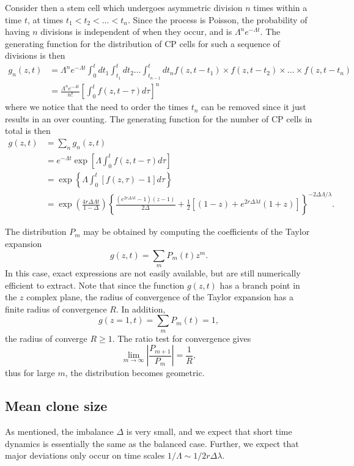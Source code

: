 \documentclass[10pt,UKenglish]{article}
\begin{document}
Consider then a stem cell which undergoes asymmetric division $n$ times within a
time $t$, at times $t_1 < t_2 < \ldots < t_n$. Since the process is Poisson, the
probability of having $n$ divisions is independent of when they occur, and is
$\Lambda^n e^{-\Lambda t}$. The generating function for the distribution of CP
cells for such a sequence of divisions is then
\begin{align*}
g_n(z,t) &= \Lambda^n e^{-\Lambda t} \int_0^t dt_1 \int_{t_1}^t dt_2 \ldots \int_{t_{n-1}}^t dt_n f(z,t-t_1) \times f(z,t-t_2) \times \ldots \times f(z,t-t_n) \\
 &= \frac{\Lambda^n e^{-\Lambda t}}{n!} \left[\int_0^t f(z,t-\tau) d\tau \right]^n
\end{align*}
where we notice that the need to order the times $t_n$ can be removed since it
just results in an over counting. The generating function for the number of CP
cells in total is then
\begin{align*}
g(z,t) &= \sum_n g_n(z,t) \\
 &= e^{-\Lambda t} \exp\left[\Lambda \int_0^t f(z,t-\tau) d\tau \right] \\
 &= \exp\left\{\Lambda \int_0^t \left[f(z,\tau) - 1\right] d\tau \right\} \\
 &= \exp\left(\frac{4 r \Delta \Lambda t}{1-\Delta}\right) \left\{ \frac{\left(e^{2 r \Delta \lambda t}-1 \right)(z-1)}{2\Delta} + \frac{1}{2}\left[(1-z) + e^{2 r \Delta \lambda t}(1+z) \right]\right\}^{-2\Delta\Lambda/\lambda}.
\end{align*}

The distribution $P_m$ may be obtained by computing the coefficients of the
Taylor expansion $$g(z,t) = \sum_m P_m(t) z^m.$$ In this case, exact expressions
are not easily available, but are still numerically efficient to extract. Note
that since the function $g(z,t)$ has a branch point in the $z$ complex plane,
the radius of convergence of the Taylor expansion has a finite radius of
convergence $R$. In addition, $$g(z=1,t) = \sum_m P_m(t) = 1,$$ the radius of
converge $R \ge 1$. The ratio test for convergence gives $$\lim_{m\rightarrow
\infty} \left| \frac{P_{m+1}}{P_m} \right| = \frac{1}{R},$$ thus for large $m$,
the distribution becomes geometric.

\subsection{Mean clone size}

As mentioned, the imbalance $\Delta$ is very small, and we expect that short
time dynamics is essentially the same as the balanced case. Further, we expect
that major deviations only occur on time scales $1/\Lambda \sim 1/2 r \Delta
\lambda$.
\end{document}
